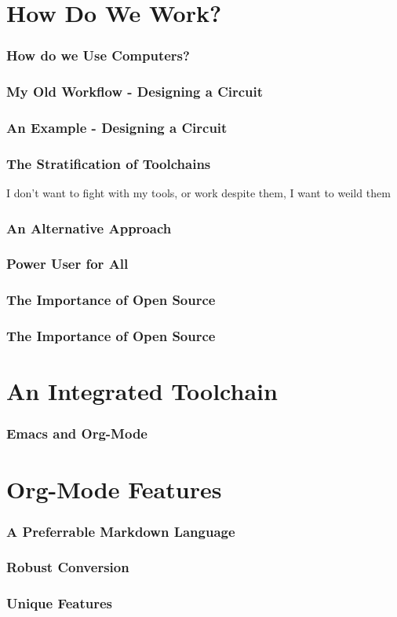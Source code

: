 \documentclass{beamer}
\begin{document}
    \section{How Do We Work?}
        \begin{frame}
            \frametitle{How do we Use Computers?}
            \centering
            
        \end{frame}
        \begin{frame}
            \frametitle{My Old Workflow - Designing a Circuit}
        \end{frame}
        \begin{frame}
            \frametitle{An Example - Designing a Circuit}
        \end{frame}
        \begin{frame}
          \frametitle{The Stratification of Toolchains}
          I don't want to fight with my tools, or work despite them, I want to weild them
        \end{frame}
        \begin{frame}
            \frametitle{An Alternative Approach}
        \end{frame}
        \begin{frame}
            \frametitle{Power User for All}
        \end{frame}
        \begin{frame}
            \frametitle{The Importance of Open Source}
        \end{frame}
        \begin{frame}
            \frametitle{The Importance of Open Source}
        \end{frame}
    \section{An Integrated Toolchain}
        \begin{frame}
            \frametitle{}
        \end{frame}
        \begin{frame}
            \frametitle{Emacs and Org-Mode}
        \end{frame}
    \section{Org-Mode Features}
        \begin{frame}
            \frametitle{A Preferrable Markdown Language}
        \end{frame}
        \begin{frame}
            \frametitle{Robust Conversion}
        \end{frame}
        \begin{frame}
            \frametitle{Unique Features}
        \end{frame}
\end{document}
